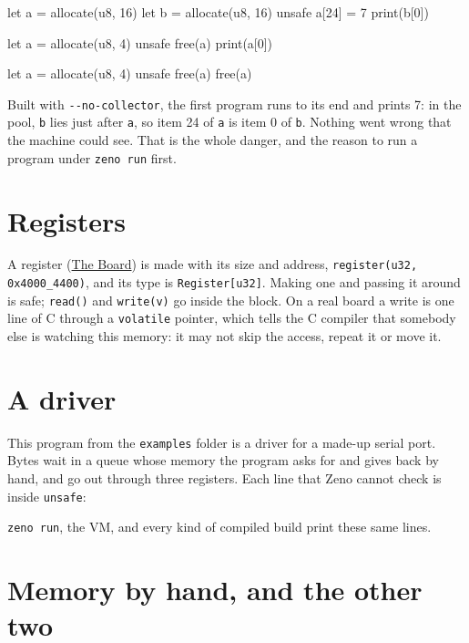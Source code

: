 \begin{zeno}[fails=yes]
let a = allocate(u8, 16)
let b = allocate(u8, 16)
unsafe {
    a[24] = 7
    print(b[0])
}
\end{zeno}

\begin{zeno}[fails=yes]
let a = allocate(u8, 4)
unsafe {
    free(a)
    print(a[0])
}
\end{zeno}

\begin{zeno}[fails=yes]
let a = allocate(u8, 4)
unsafe {
    free(a)
    free(a)
}
\end{zeno}

Built with \verb|--no-collector|, the first program runs to its end and
prints 7: in the pool, \verb|b| lies just after \verb|a|, so item 24 of
\verb|a| is item 0 of \verb|b|. Nothing went wrong that the machine
could see. That is the whole danger, and the reason to run a program
under \verb|zeno run| first.

\section{Registers}

A register (\hyperref[ch-board]{The Board}) is made with its size and
address, \verb|register(u32, 0x4000_4400)|, and its type is
\verb|Register[u32]|. Making one and passing it around is safe;
\verb|read()| and \verb|write(v)| go inside the block. On a real board
a write is one line of C through a \verb|volatile| pointer, which tells
the C compiler that somebody else is watching this memory: it may not
skip the access, repeat it or move it.

\section{A driver}

This program from the \verb|examples| folder is a driver for a made-up
serial port. Bytes wait in a queue whose memory the program asks for
and gives back by hand, and go out through three registers. Each line
that Zeno cannot check is inside \verb|unsafe|:

\begin{zeno}[src=examples/driver.zeno]
\end{zeno}

\verb|zeno run|, the VM, and every kind of compiled build print these
same lines.

\section{Memory by hand, and the other two}

